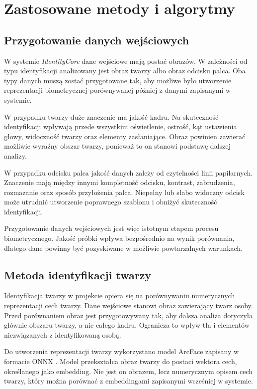 \chapter{Zastosowane metody i algorytmy}
\label{chap:metody-algorytmy}

\section{Przygotowanie danych wejściowych}

W systemie \textit{IdentityCore} dane wejściowe mają postać obrazów. W zależności od typu identyfikacji analizowany jest obraz twarzy albo obraz odcisku palca. Oba typy danych muszą zostać przygotowane tak, aby możliwe było utworzenie reprezentacji biometrycznej porównywanej później z danymi zapisanymi w systemie.

W przypadku twarzy duże znaczenie ma jakość kadru. Na skuteczność identyfikacji wpływają przede wszystkim oświetlenie, ostrość, kąt ustawienia głowy, widoczność twarzy oraz elementy zasłaniające. Obraz powinien zawierać możliwie wyraźny obszar twarzy, ponieważ to on stanowi podstawę dalszej analizy.

W przypadku odcisku palca jakość danych zależy od czytelności linii papilarnych. Znaczenie mają między innymi kompletność odcisku, kontrast, zabrudzenia, rozmazanie oraz sposób przyłożenia palca. Niepełny lub słabo widoczny odcisk może utrudnić utworzenie poprawnego szablonu i obniżyć skuteczność identyfikacji.

Przygotowanie danych wejściowych jest więc istotnym etapem procesu biometrycznego. Jakość próbki wpływa bezpośrednio na wynik porównania, dlatego dane powinny być pozyskiwane w możliwie powtarzalnych warunkach.

\section{Metoda identyfikacji twarzy}

Identyfikacja twarzy w projekcie opiera się na porównywaniu numerycznych reprezentacji cech twarzy. Dane wejściowe stanowi obraz zawierający twarz osoby. Przed porównaniem obraz jest przygotowywany tak, aby dalsza analiza dotyczyła głównie obszaru twarzy, a nie całego kadru. Ogranicza to wpływ tła i elementów niezwiązanych z identyfikowaną osobą.

Do utworzenia reprezentacji twarzy wykorzystano model ArcFace zapisany w formacie ONNX \cite{arcface, onnx}. Model przekształca obraz twarzy do postaci wektora cech, określanego jako embedding. Nie jest on obrazem, lecz numerycznym opisem cech twarzy, który można porównać z embeddingami zapisanymi wcześniej w systemie.


